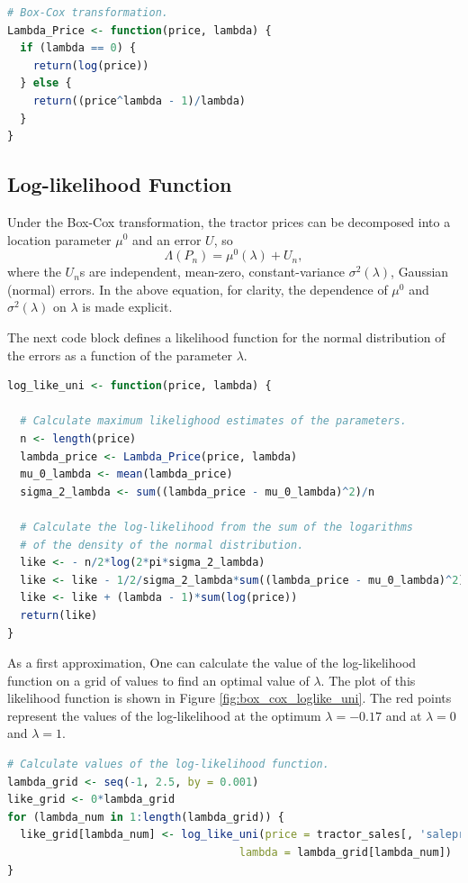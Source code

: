 \documentclass[11pt]{book}
\begin{document}
\vspace{1.0in}

\begin{lstlisting}[language=R]
# Box-Cox transformation.
Lambda_Price <- function(price, lambda) {
  if (lambda == 0) {
    return(log(price))
  } else {
    return((price^lambda - 1)/lambda)
  }
}
\end{lstlisting}

\pagebreak
\subsection{Log-likelihood Function}

Under the Box-Cox transformation,
the tractor prices can be decomposed into a location parameter $\mu^0$ 
and an error $U$, so
$$\Lambda(P_n) = \mu^0(\lambda) + U_n,$$
where the $U_n$s are independent, mean-zero, constant-variance 
$\sigma^2(\lambda)$, Gaussian (normal) errors. 
In the above equation, for clarity, the dependence of $\mu^0$ and 
$\sigma^2(\lambda)$ on $\lambda$ is made explicit.


The next code block defines a likelihood function for the normal distribution of the errors
as a function of the parameter $\lambda$.

\begin{lstlisting}[language=R]
log_like_uni <- function(price, lambda) {

  # Calculate maximum likelighood estimates of the parameters.
  n <- length(price)
  lambda_price <- Lambda_Price(price, lambda)
  mu_0_lambda <- mean(lambda_price)
  sigma_2_lambda <- sum((lambda_price - mu_0_lambda)^2)/n

  # Calculate the log-likelihood from the sum of the logarithms
  # of the density of the normal distribution.
  like <- - n/2*log(2*pi*sigma_2_lambda)
  like <- like - 1/2/sigma_2_lambda*sum((lambda_price - mu_0_lambda)^2)
  like <- like + (lambda - 1)*sum(log(price))
  return(like)
}
\end{lstlisting}

\pagebreak
As a first approximation, 
One can calculate the value of the log-likelihood function on a grid of values
to find an optimal value of $\lambda$.
The plot of this likelihood function is shown in Figure \ref{fig:box_cox_loglike_uni}.
The red points represent the values of the log-likelihood 
at the optimum $\lambda = -0.17$ and at $\lambda = 0$ and $\lambda = 1$.

\begin{lstlisting}[language=R]
# Calculate values of the log-likelihood function.
lambda_grid <- seq(-1, 2.5, by = 0.001)
like_grid <- 0*lambda_grid
for (lambda_num in 1:length(lambda_grid)) {
  like_grid[lambda_num] <- log_like_uni(price = tractor_sales[, 'saleprice'],
                                    lambda = lambda_grid[lambda_num])
}
\end{lstlisting}
\end{document}
